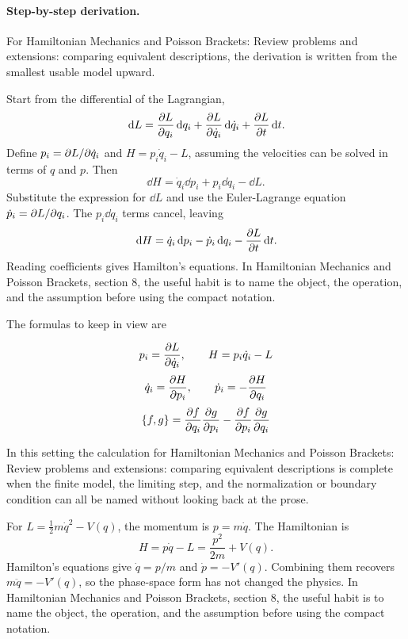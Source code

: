 \paragraph{Step-by-step derivation.}

For Hamiltonian Mechanics and Poisson Brackets: Review problems and extensions: comparing equivalent descriptions, the derivation is written from the smallest usable model upward.

Start from the differential of the Lagrangian,
\[
  \,\mathrm d L=\frac{\partial L}{\partial q_i}\,\mathrm d q_i+\frac{\partial L}{\partial\dot q_i}\,\mathrm d\dot q_i+\frac{\partial L}{\partial t}\,\mathrm d t.
\]
Define \(p_i=\partial L/\partial\dot q_i\) and \(H=p_i\dot q_i-L\), assuming the velocities can be solved in terms of \(q\) and \(p\).  Then
\[
  \dd H=\dot q_i\dd p_i+p_i\dd\dot q_i-\dd L.
\]
Substitute the expression for \(\dd L\) and use the Euler-Lagrange equation \(\dot p_i=\partial L/\partial q_i\).  The \(p_i\dd\dot q_i\) terms cancel, leaving
\[
  \,\mathrm d H=\dot q_i\,\mathrm d p_i-\dot p_i\,\mathrm d q_i-\frac{\partial L}{\partial t}\,\mathrm d t.
\]
Reading coefficients gives Hamilton's equations.  In Hamiltonian Mechanics and Poisson Brackets, section 8, the useful habit is to name the object, the operation, and the assumption before using the compact notation.

The formulas to keep in view are

\[
  p_i=\frac{\partial L}{\partial\dot q_i},\qquad H=p_i\dot q_i-L
\]
\[
  \dot q_i=\frac{\partial H}{\partial p_i},\qquad \dot p_i=-\frac{\partial H}{\partial q_i}
\]
\[
  \{f,g\}=\frac{\partial f}{\partial q_i}\frac{\partial g}{\partial p_i}-\frac{\partial f}{\partial p_i}\frac{\partial g}{\partial q_i}
\]

In this setting the calculation for Hamiltonian Mechanics and Poisson Brackets: Review problems and extensions: comparing equivalent descriptions is complete when the finite model, the limiting step, and the normalization or boundary condition can all be named without looking back at the prose.




\begin{example}
For \(L=\frac12m\dot q^2-V(q)\), the momentum is \(p=m\dot q\).  The Hamiltonian is
\[
  H=p\dot q-L=\frac{p^2}{2m}+V(q).
\]
Hamilton's equations give \(\dot q=p/m\) and \(\dot p=-V'(q)\).  Combining them recovers \(m\ddot q=-V'(q)\), so the phase-space form has not changed the physics.  In Hamiltonian Mechanics and Poisson Brackets, section 8, the useful habit is to name the object, the operation, and the assumption before using the compact notation.
\end{example}



